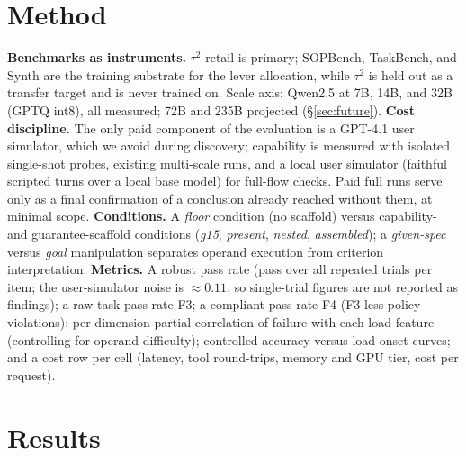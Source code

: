 \documentclass[10pt]{article}
\begin{document}
\section{Method}\label{sec:method}
\textbf{Benchmarks as instruments.} $\tau^2$-retail is primary; SOPBench, TaskBench, and Synth are the training substrate for the lever allocation, while $\tau^2$ is held out as a transfer target and is never trained on. Scale axis: Qwen2.5 at 7B, 14B, and 32B (GPTQ int8), all measured; 72B and 235B projected (\S\ref{sec:future}).
\textbf{Cost discipline.} The only paid component of the evaluation is a GPT-4.1 user simulator, which we avoid during discovery; capability is measured with isolated single-shot probes, existing multi-scale runs, and a local user simulator (faithful scripted turns over a local base model) for full-flow checks. Paid full runs serve only as a final confirmation of a conclusion already reached without them, at minimal scope.
\textbf{Conditions.} A \emph{floor} condition (no scaffold) versus capability- and guarantee-scaffold conditions (\emph{g15}, \emph{present}, \emph{nested}, \emph{assembled}); a \emph{given-spec} versus \emph{goal} manipulation separates operand execution from criterion interpretation.
\textbf{Metrics.} A robust pass rate (pass over all repeated trials per item; the user-simulator noise is $\approx0.11$, so single-trial figures are not reported as findings); a raw task-pass rate F3; a compliant-pass rate F4 (F3 less policy violations); per-dimension partial correlation of failure with each load feature (controlling for operand difficulty); controlled accuracy-versus-load onset curves; and a cost row per cell (latency, tool round-trips, memory and GPU tier, cost per request).

\section{Results}
\end{document}
